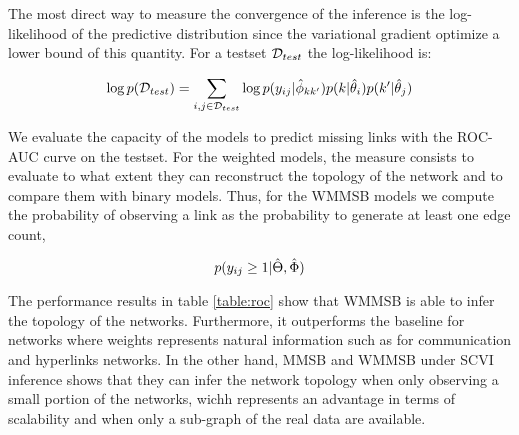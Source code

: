 %
%

The most direct way to measure the convergence of the inference is the log-likelihood of the predictive distribution since the variational gradient optimize a lower bound of this quantity. For a testset $\mathcal{D}_{test}$ the log-likelihood is:

\begin{figure}[h]
\centering
	
    \label{fig:conv_entropy}
\end{figure}

\begin{equation*}
\log p(\mathcal{D}_{test}) = \sum_{i,j \in \mathcal{D}_{test}} \log p(y_{ij} | \hat\phi_{kk'}) p(k|\hat\theta_i) p(k'|\hat\theta_j)
\end{equation*}


%
%

We evaluate the capacity of the models to predict missing links with the ROC-AUC curve on the testset. For the weighted models, the measure consists to evaluate to what extent they can reconstruct the topology of the network and to compare them with binary models. Thus, for the WMMSB models we compute the probability of observing a link as the probability to generate at least one edge count,

\begin{table}
	
\label{table:roc}
\end{table}

\begin{equation*}
p(y_{ij} \geq 1 | \hat\Theta, \hat\Phi)
\end{equation*}

The performance results in table \ref{table:roc} show that WMMSB is able to infer the topology of the networks. Furthermore, it outperforms the baseline for networks where weights represents natural information such as for communication and hyperlinks networks. 
In the other hand, MMSB and WMMSB under SCVI inference shows that they can infer the network topology when only observing a small portion of the networks, wichh represents an advantage in terms of scalability and when only a sub-graph of the real data are available.

%
%

%



%
%




